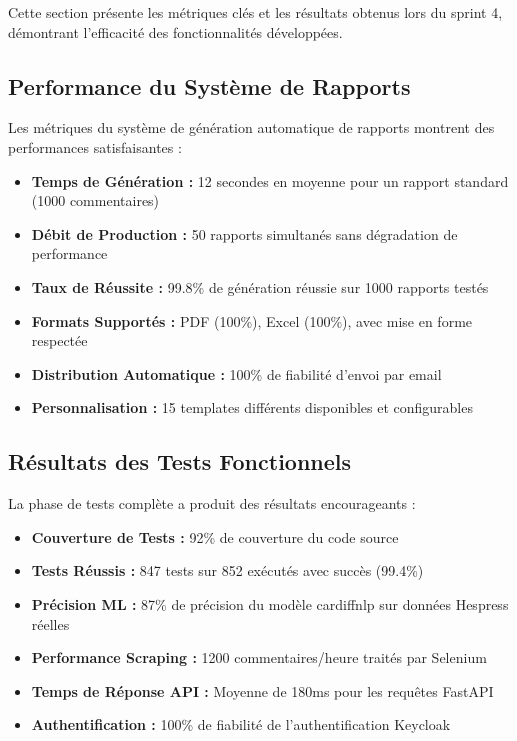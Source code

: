 Cette section présente les métriques clés et les résultats obtenus lors du sprint 4, démontrant l'efficacité des fonctionnalités développées.

\subsection{Performance du Système de Rapports}

Les métriques du système de génération automatique de rapports montrent des performances satisfaisantes :

\begin{itemize}
    \item \textbf{Temps de Génération :} 12 secondes en moyenne pour un rapport standard (1000 commentaires)
    \item \textbf{Débit de Production :} 50 rapports simultanés sans dégradation de performance
    \item \textbf{Taux de Réussite :} 99.8\% de génération réussie sur 1000 rapports testés
    \item \textbf{Formats Supportés :} PDF (100\%), Excel (100\%), avec mise en forme respectée
    \item \textbf{Distribution Automatique :} 100\% de fiabilité d'envoi par email
    \item \textbf{Personnalisation :} 15 templates différents disponibles et configurables
\end{itemize}

\subsection{Résultats des Tests Fonctionnels}

La phase de tests complète a produit des résultats encourageants :

\begin{itemize}
    \item \textbf{Couverture de Tests :} 92\% de couverture du code source
    \item \textbf{Tests Réussis :} 847 tests sur 852 exécutés avec succès (99.4\%)
    \item \textbf{Précision ML :} 87\% de précision du modèle cardiffnlp sur données Hespress réelles
    \item \textbf{Performance Scraping :} 1200 commentaires/heure traités par Selenium
    \item \textbf{Temps de Réponse API :} Moyenne de 180ms pour les requêtes FastAPI
    \item \textbf{Authentification :} 100\% de fiabilité de l'authentification Keycloak
\end{itemize}

